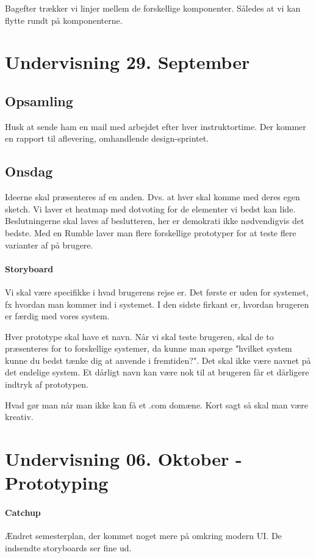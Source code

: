 \documentclass{article}
\begin{document}
Bagefter trækker vi linjer mellem de forskellige komponenter. Således at vi kan
flytte rundt på komponenterne.

\newpage
\section{Undervisning 29. September}
\subsection{Opsamling}
Husk at sende ham en mail med arbejdet efter hver instruktortime. Der kommer en
rapport til aflevering, omhandlende design-sprintet.

\subsection{Onsdag}

Ideerne skal præsenteres af en anden. Dvs. at hver skal komme med deres egen
sketch. Vi laver et heatmap med dotvoting for de elementer vi bedst kan lide.
Beslutningerne skal laves af beslutteren, her er demokrati ikke nødvendigvis det
bedste.
Med en Rumble laver man flere forskellige prototyper for at teste flere
varianter af på brugere.

\paragraph{Storyboard} 
Vi skal være specifikke i hvad brugerens rejse er. Det første er uden for
systemet, fx hvordan man kommer ind i systemet. I den sidste firkant er, hvordan
brugeren er færdig med vores system.

Hver prototype skal have et navn. Når vi skal teste brugeren, skal de to
præsenteres for to forskellige systemer, da kunne man spørge "hvilket system
kunne du bedst tænke dig at anvende i fremtiden?". Det skal ikke være navnet på
det endelige system. Et dårligt navn kan være nok
til at brugeren får et dårligere indtryk af prototypen.

Hvad gør man når man ikke kan få et .com domæne. Kort sagt så skal man være
kreativ.

\newpage
\section{Undervisning 06. Oktober - Prototyping}

\paragraph{Catchup}
Ændret semesterplan, der kommet noget mere på omkring modern UI. De indsendte
storyboards ser fine ud.
\end{document}
